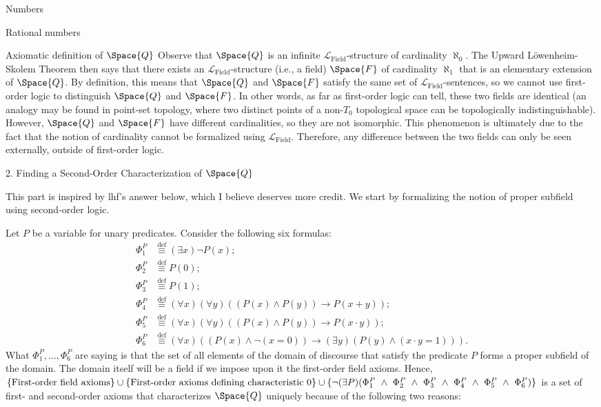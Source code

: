 \begin{plSection}{Numbers}
\begin{plSection}{Rational numbers}
\begin{plSection}{Axiomatic definition of \texorpdfstring{$\Space{Q}$}{Q}}
Observe that $ \Space{Q} $ is an infinite 
$ \mathcal{L}_{\text{Field}} $-structure 
of cardinality $ \aleph_{0} $. 
The Upward L\"{o}wenheim-Skolem Theorem then says that 
there exists an $ \mathcal{L}_{\text{Field}} $-structure 
(i.e., a field) $ \Space{F} $ of cardinality $ \aleph_{1} $ 
that is an elementary extension of $ \Space{Q} $. 
By definition, this means that $ \Space{Q} $ and $ \Space{F} $ 
satisfy the same set of $ \mathcal{L}_{\text{Field}} $-sentences, 
so we cannot use first-order logic to distinguish $ \Space{Q} $ 
and $ \Space{F} $. In other words, as far as first-order logic 
can tell, these two fields are identical
(an analogy may be found in point-set topology,
where two distinct points of a non-$ T_{0} $ topological space 
can be topologically indistinguishable). 
However, $ \Space{Q} $ and $ \Space{F} $ have different 
cardinalities, so they are not isomorphic. 
This phenomenon is ultimately due to the fact 
that the notion of cardinality cannot be formalized
 using $ \mathcal{L}_{\text{Field}} $. 
 Therefore, any difference between the two fields 
 can only be seen externally, outside of first-order logic.

2. Finding a Second-Order Characterization of $ \Space{Q} $

This part is inspired by lhf's answer below, 
which I believe deserves more credit. 
We start by formalizing the notion of proper subfield 
using second-order logic.

Let $ P $ be a variable for unary predicates. 
Consider the following six formulas: 
\begin{align} 
\Phi^{P}_{1} &\stackrel{\text{def}}{\equiv} 
(\exists x) \neg P(x); 
\\ \Phi^{P}_{2} &\stackrel{\text{def}}{\equiv} P(0); 
\\ \Phi^{P}_{3} &\stackrel{\text{def}}{\equiv} P(1); 
\\ \Phi^{P}_{4} &\stackrel{\text{def}}{\equiv} 
(\forall x)(\forall y)((P(x) \land P(y)) 
\rightarrow P(x + y)); \\ \Phi^{P}_{5} 
&\stackrel{\text{def}}{\equiv} 
(\forall x)(\forall y)
((P(x) 
\land P(y)) \rightarrow P(x \cdot y));
\\ \Phi^{P}_{6} 
&\stackrel{\text{def}}{\equiv} 
(\forall x)((P(x) \land \neg (x = 0)) \rightarrow
(\exists y)(P(y) \land (x \cdot y = 1))). 
\end{align} 
What $ \Phi^{P}_{1},\ldots,\Phi^{P}_{6} $ are saying is that 
the set of all elements of the domain of discourse 
that satisfy the predicate $ P $ 
forms a proper subfield of the domain. 
The domain itself will be a field 
if we impose upon it the first-order field axioms. 
Hence, 
$ \{ \text{First-order field axioms} \} 
\cup 
\{ \text{First-order axioms defining characteristic $ 0 $} \}
 \cup
\{ \neg (\exists P)(\Phi^{P}_{1} 
~ \land ~ \Phi^{P}_{2} ~ \land ~ 
\Phi^{P}_{3} ~ \land ~ 
\Phi^{P}_{4} ~ \land ~ 
\Phi^{P}_{5} ~ \land ~ \Phi^{P}_{6}) \} $
is a set of first- and second-order axioms that characterizes
$ \Space{Q} $ uniquely because of the following two reasons:


\end{plSection}
\end{plSection}
\end{plSection}
